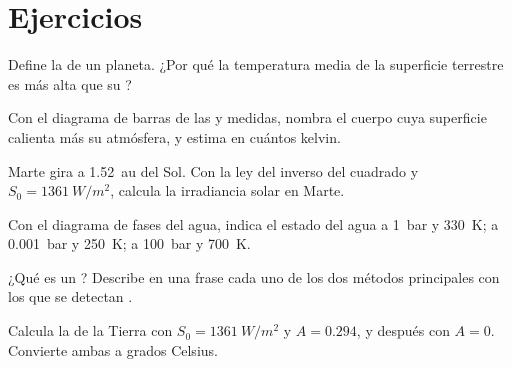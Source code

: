 \section{Ejercicios}

\begin{exercise}[$\star$]\label{exo:g10:habitable-planet:1}
Define la  de un planeta. ¿Por qué la temperatura
media de la superficie terrestre es más alta que su ?
\end{exercise}

\begin{exercise}[$\star$]\label{exo:g10:habitable-planet:2}
Con el diagrama de barras de las  y medidas, nombra
el cuerpo cuya superficie calienta más su atmósfera, y estima en cuántos
kelvin.
\end{exercise}

\begin{exercise}[$\star$]\label{exo:g10:habitable-planet:3}
Marte gira a \qty{1.52}{au} del Sol. Con la ley del inverso del cuadrado y
$S_0 = \qty{1361}{W/m^2}$, calcula la irradiancia solar en Marte.
\end{exercise}

\begin{exercise}[$\star$]\label{exo:g10:habitable-planet:4}
Con el diagrama de fases del agua, indica el estado del agua a \qty{1}{bar}
y \qty{330}{K}; a \qty{0.001}{bar} y \qty{250}{K}; a \qty{100}{bar} y
\qty{700}{K}.
\end{exercise}

\begin{exercise}[$\star$]\label{exo:g10:habitable-planet:5}
¿Qué es un ? Describe en una frase cada uno de los dos métodos
principales con los que se detectan .
\end{exercise}

\begin{exercise}[$\star\star$]\label{exo:g10:habitable-planet:6}
Calcula la  de la Tierra con
$S_0 = \qty{1361}{W/m^2}$ y $A = 0.294$, y después con $A = 0$. Convierte
ambas a grados Celsius.
\end{exercise}


